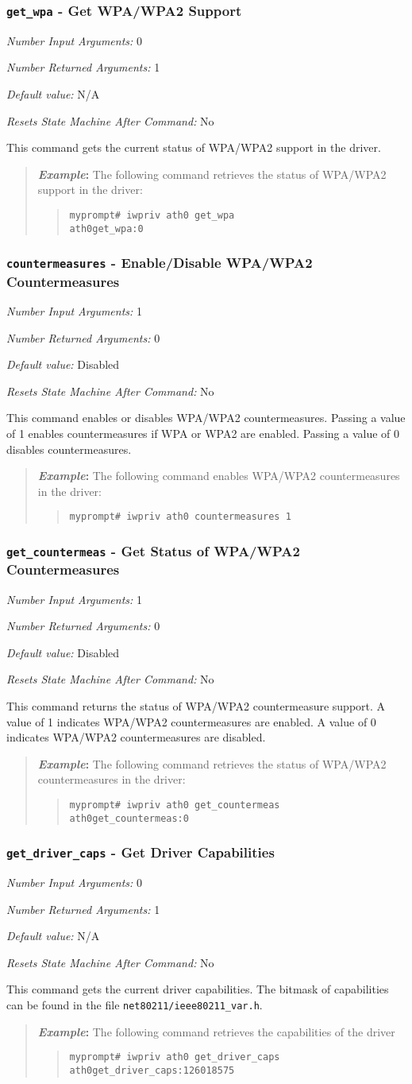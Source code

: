 \documentclass[10pt,fullpage]{article}
\newcommand{\mytt}[1]{{\texttt{#1}}}
\newcommand{\bv}{\begin{verse}}
\newcommand{\ev}{\end{verse}}
\newcommand{\cmd}[1]{{\texttt{myprompt\# #1}}}
\newcommand{\argdesc}[4]{\begin{description}
\itemsep -6pt
\item \textit{Number Input Arguments:} #1
\item \textit{Number Returned Arguments:} #2
\item \textit{Default value:} #3
\item \textit{Resets State Machine After Command:} #4
\end{description}
}
\newenvironment{example}{\begin{quote}\textbf{\textit{Example}:}}{\end{quote}}
\begin{document}
\subsubsection{\mytt{get\_wpa} - Get WPA/WPA2 Support}
\argdesc{0}{1}{N/A}{No}
This command gets the current status of WPA/WPA2 support in the driver.
\begin{example}
  The following command retrieves the status of WPA/WPA2 support in
  the driver:
  \bv
  \cmd{iwpriv ath0 get\_wpa}\\
  \mytt{ath0\hspace{32pt}get\_wpa:0}
  \ev
\end{example}

\subsubsection{\mytt{countermeasures} - Enable/Disable WPA/WPA2 Countermeasures}
\argdesc{1}{0}{Disabled}{No}
This command enables or disables WPA/WPA2 countermeasures.  Passing a
value of 1 enables countermeasures if WPA or WPA2 are enabled.
Passing a value of 0 disables countermeasures.
\begin{example}
  The following command enables WPA/WPA2 countermeasures in the driver:
  \bv
  \cmd{iwpriv ath0 countermeasures 1}
  \ev
\end{example}

\subsubsection{\mytt{get\_countermeas} - Get Status of WPA/WPA2 Countermeasures}
\argdesc{1}{0}{Disabled}{No}
This command returns the status of WPA/WPA2 countermeasure support.
A value of 1 indicates WPA/WPA2 countermeasures are enabled.
A value of 0 indicates WPA/WPA2 countermeasures are disabled.
\begin{example}
  The following command retrieves the status of WPA/WPA2
  countermeasures in the driver:
  \bv
  \cmd{iwpriv ath0 get\_countermeas}\\
  \mytt{ath0\hspace{32pt}get\_countermeas:0}
  \ev
\end{example}

\subsubsection{\mytt{get\_driver\_caps} - Get Driver Capabilities}
\argdesc{0}{1}{N/A}{No}
This command gets the current driver capabilities.  The bitmask of
capabilities can be found in the file \mytt{net80211/ieee80211\_var.h}.
\begin{example}
  The following command retrieves the capabilities of the driver
  \bv
  \cmd{iwpriv ath0 get\_driver\_caps}\\
  \mytt{ath0\hspace{32pt}get\_driver\_caps:126018575}
\ev
\end{example}
\end{document}

